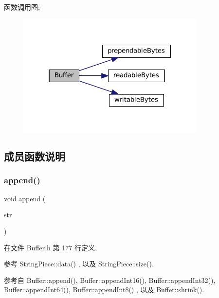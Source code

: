 函数调用图\+:
\nopagebreak
\begin{figure}[H]
\begin{center}
\leavevmode
\includegraphics[width=267pt]{classmuduo_1_1net_1_1Buffer_a3189a466a75c249c9371b74325e4fc53_cgraph}
\end{center}
\end{figure}


\subsection{成员函数说明}
\mbox{\label{classmuduo_1_1net_1_1Buffer_af02baace4e1946f318dfa5c4d5d4bb3c}} 
\subsubsection{\texorpdfstring{append()}{append()}\hspace{0.1cm}{\footnotesize\ttfamily [1/3]}}
{\footnotesize\ttfamily void append (\begin{DoxyParamCaption}\item[{const \hyperlink{classmuduo_1_1StringPiece}{String\+Piece} \&}]{str }\end{DoxyParamCaption})\hspace{0.3cm}{\ttfamily [inline]}}



在文件 Buffer.\+h 第 177 行定义.



参考 String\+Piece\+::data() , 以及 String\+Piece\+::size().



参考自 Buffer\+::append(), Buffer\+::append\+Int16(), Buffer\+::append\+Int32(), Buffer\+::append\+Int64(), Buffer\+::append\+Int8() , 以及 Buffer\+::shrink().


